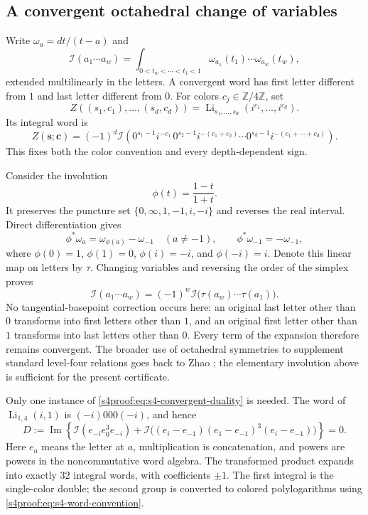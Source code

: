 \subsection{A convergent octahedral change of variables}
Write $\omega_a=dt/(t-a)$ and
\[
 \mathcal I(a_1\cdots a_w)
 =\int_{0<t_w<\cdots<t_1<1}
     \omega_{a_1}(t_1)\cdots\omega_{a_w}(t_w),
\]
extended multilinearly in the letters. A convergent word has first letter
different from $1$ and last letter different from $0$.
For colors $c_j\in\mathbb Z/4\mathbb Z$, set
\[
 Z((s_1,c_1),\ldots,(s_d,c_d))
 =\operatorname{Li}_{s_1,\ldots,s_d}(i^{c_1},\ldots,i^{c_d}).
\]
Its integral word is
\begin{equation}\label{s4proof:eq:s4-word-convention}
 Z(\boldsymbol s;\boldsymbol c)
 =(-1)^d\mathcal I\left(
 0^{s_1-1}i^{-c_1}\,
 0^{s_2-1}i^{-(c_1+c_2)}\cdots
 0^{s_d-1}i^{-(c_1+\cdots+c_d)}\right).
\end{equation}
This fixes both the color convention and every depth-dependent sign.

Consider the involution
\[
 \phi(t)=\frac{1-t}{1+t}.
\]
It preserves the puncture set $\{0,\infty,1,-1,i,-i\}$ and reverses the
real interval. Direct differentiation gives
\[
 \phi^*\omega_a=\omega_{\phi(a)}-\omega_{-1}\quad(a\ne-1),
 \qquad \phi^*\omega_{-1}=-\omega_{-1},
\]
where $\phi(0)=1$, $\phi(1)=0$, $\phi(i)=-i$, and
$\phi(-i)=i$. Denote this linear map on letters by $\tau$.
Changing variables and reversing the order of the simplex proves
\begin{equation}\label{s4proof:eq:s4-convergent-duality}
 \mathcal I(a_1\cdots a_w)
 =(-1)^w\mathcal I\bigl(\tau(a_w)\cdots\tau(a_1)\bigr).
\end{equation}
No tangential-basepoint correction occurs here: an original last letter
other than $0$ transforms into first letters other than $1$, and an original
first letter other than $1$ transforms into last letters other than $0$.
Every term of the expansion therefore remains convergent.
The broader use of octahedral symmetries to supplement standard level-four
relations goes back to Zhao \cite{s4proof:jqzhao2008,gaussian:Zhao}; the elementary
involution above is sufficient for the present certificate.

Only one instance of \eqref{s4proof:eq:s4-convergent-duality} is needed. The word of
$\operatorname{Li}_{1,4}(i,1)$ is $(-i)000(-i)$, and hence
\begin{equation}\label{s4proof:eq:s4-duality-seed}
 D:=\operatorname{Im}\left\{
 \mathcal I(e_{-i}e_0^3e_{-i})+
 \mathcal I\bigl((e_i-e_{-1})(e_1-e_{-1})^3(e_i-e_{-1})\bigr)\right\}=0.
\end{equation}
Here $e_a$ means the letter at $a$, multiplication is concatenation, and
powers are powers in the noncommutative word algebra. The transformed product expands into
exactly $32$ integral words, with coefficients $\pm1$. The first integral is
the single-color double; the second group is converted to colored
polylogarithms using \eqref{s4proof:eq:s4-word-convention}.

